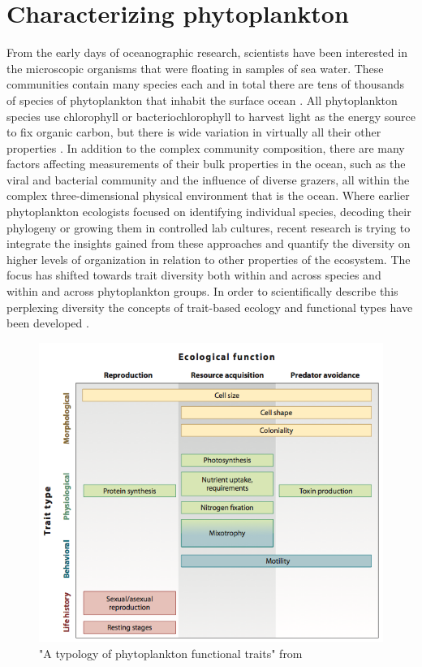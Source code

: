\section{Characterizing phytoplankton}
From the early days of oceanographic research, scientists have been interested in the microscopic organisms that were floating in samples of sea water. These communities contain many species each and in total there are tens of thousands of species of phytoplankton that inhabit the surface ocean \citep{DeVargas2015}. All phytoplankton species use chlorophyll or bacteriochlorophyll to harvest light as the energy source to fix organic carbon, but there is wide variation in virtually all their other properties \citep{Litchman2008}. In addition to the complex community composition, there are many factors affecting measurements of their bulk properties in the ocean, such as the viral and bacterial community and the influence of diverse grazers, all within the complex three-dimensional physical environment that is the ocean. 
Where earlier phytoplankton ecologists focused on identifying individual species, decoding their phylogeny or growing them in controlled lab cultures, recent research is trying to integrate the insights gained from these approaches and quantify the diversity on higher levels of organization in relation to other properties of the ecosystem. The focus has shifted towards trait diversity both within and across species and within and across phytoplankton groups. In order to scientifically describe this perplexing diversity the concepts of trait-based ecology and functional types have been developed \citep{Tilman2001,McGill2006,Violle2007c}.

\begin{figure}
\centering
\includegraphics[width=0.7\linewidth]{./Chp1-Intro/Fig_litchman2008.png}
\caption[Scheme]{\small{"A typology of phytoplankton functional traits" from \cite{Litchman2008}}}
\label{PhytoTraits}
\end{figure}

